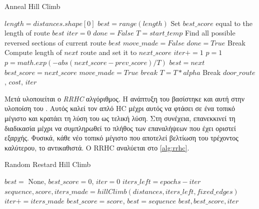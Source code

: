 \begin{algorithm}[H]
\caption{Anneal Hill Climb}
\label{alg:anneal}
\begin{algorithmic}[1]
        \State $length = distances.shape[0]$
        \State $best = range(length)$
        \State Set $best\_score$ equal to the length of route $best$
        \State $iter = 0$
        \State $done = False$
        \State $T = start\_temp$
            \State Find all possible reversed sections of current route $best$ 
            \State $move\_made = False$
                    \State $done = True$
                    \State Break
                \EndIf
                \State Compute length of $next$ route and set it to $next\_score$
                \State $iter += 1$
                    \State $p = 1$
                \Else
                    \State $p = math.exp(-abs(next\_score - prev\_score)/T)$
                \EndIf
                \State {}
                    \State $best = next$
                    \State $best\_score = next\_score$
                    \State $move\_made = True$
                    \State $break$
                \EndIf
            \EndFor
            \State $T = T * alpha$
                \State Break
            \EndIf
        \EndWhile
        \State \Return $door\_route$, $cost$, $iter$
\end{algorithmic}
\end{algorithm}


Μετά υλοποιείται ο \emph{RRHC} αλγόριθμος. Η ανάπτυξη του βασίστηκε και αυτή στην υλοποίση του \cite{tspHC}. Αυτός καλεί τον απλό HC μέχρι αυτός να φτάσει σε ένα τοπικό μέγιστο και κρατάει τη λύση του ως τελική λύση. Στη συνέχεια, επανεκκινεί τη διαδικασία μέχρι να συμπληρωθεί το πλήθος των επαναλήψεων που έχει οριστεί εξαρχής. Φυσικά, κάθε νέο τοπικό μέγιστο που αποτελεί βελτίωση του τρέχοντος καλύτερου, το αντικαθιστά. Ο RRHC αναλύεται στο \ref{alg:rrhc}.


\begin{algorithm}[H]
\caption{Random Restard Hill Climb}
\label{alg:rrhc}
\begin{algorithmic}[1]
        \State $best = $ None, $best\_score = 0$, $iter = 0$
            \State $iters\_left = epochs - iter$
            \State $sequence, score, iters\_made = hillClimb(distances, iters\_left, fixed\_edges)$
            \State $iter += iters\_made$
                \State $best\_score = score$, $best = sequence$
            \EndIf
        \EndWhile
        \State \Return $best, best\_score, iter$
\end{algorithmic}
\end{algorithm}


